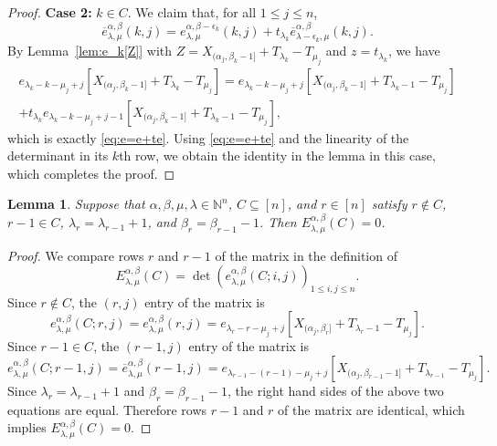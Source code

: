 \documentclass[12pt]{amsart}
\numberwithin{equation}{section}
\newtheorem{lem}[thm]{Lemma}
\theoremstyle{definition}
\newcommand\ove{\overline{e}}
\newcommand\NN{\mathbb{N}}
\begin{document}
\begin{proof}
\textbf{Case 2:} $k\in C$. We claim that, for all $1\le j\le n$,
\begin{equation}\label{eq:e=e+te}
  \ove_{\lambda,\mu}^{\alpha,\beta}(k,j)
  =e_{\lambda,\mu}^{\alpha,\beta-\epsilon_k}(k,j)
  +t_{\lambda_k} \ove_{\lambda-\epsilon_k,\mu}^{\alpha,\beta}(k,j).
\end{equation}
  By Lemma~\ref{lem:e_k[Z]} with
  $Z=X_{(\alpha_j,\beta_k-1]}+T_{\lambda_k}-T_{\mu_j}$ and $z=t_{\lambda_k}$,
  we have
  \begin{multline*}
    e_{\lambda_k-k-\mu_j+j}[X_{(\alpha_j,\beta_k-1]}+T_{\lambda_k}-T_{\mu_j}]
    = e_{\lambda_k-k-\mu_j+j}[X_{(\alpha_j,\beta_k-1]}+T_{\lambda_k-1}-T_{\mu_j}]
    \\ + t_{\lambda_k} 
    e_{\lambda_k-k-\mu_j+j-1}[X_{(\alpha_j,\beta_k-1]}+T_{\lambda_k-1}-T_{\mu_j}],
  \end{multline*}
  which is exactly \eqref{eq:e=e+te}. Using \eqref{eq:e=e+te} and the linearity
  of the determinant in its $k$th row, we obtain the identity in the lemma in
  this case, which completes the proof.
\end{proof}

\begin{lem}\label{lem:equal rows}
  Suppose that $\alpha, \beta,\mu,\lambda \in \NN^n$, $C \subseteq [n]$, and
  $r \in [n]$ satisfy $r \notin C$, $r-1 \in C$, $\lambda_r = \lambda_{r-1}+1$,
  and $\beta_r = \beta_{r-1}-1$. Then $E_{\lambda, \mu}^{\alpha, \beta}(C) = 0$.
\end{lem}
\begin{proof}
We
  compare rows $r$ and $r-1$ of the matrix in the definition of
\[
  E_{\lambda, \mu}^{\alpha, \beta}(C) =
\det\left(e^{\alpha,\beta}_{\lambda,\mu} (C;i,j)\right)_{1\le i,j\le n}.
\] 
Since $r\notin C$, the $(r,j)$ entry of the matrix is 
\[
  e^{\alpha,\beta}_{\lambda,\mu}(C;r,j)
  =e^{\alpha,\beta}_{\lambda,\mu}(r,j) 
    =e_{\lambda_r-r-\mu_j+j}[X_{(\alpha_j,\beta_r]}+T_{\lambda_r-1}-T_{\mu_j}].
\]
Since $r-1\in C$, the $(r-1,j)$ entry of the matrix is 
\[
  e^{\alpha,\beta}_{\lambda,\mu}(C;r-1,j)
  =\ove^{\alpha,\beta}_{\lambda,\mu}(r-1,j) 
    =e_{\lambda_{r-1}-(r-1)-\mu_j+j}[X_{(\alpha_j,\beta_{r-1}-1]}+T_{\lambda_{r-1}}-T_{\mu_j}].
\]
Since $\lambda_r = \lambda_{r-1}+1$ and $\beta_r = \beta_{r-1}-1$, the right
hand sides of the above two equations are equal. Therefore rows $r-1$ and $r$ of
the matrix are identical, which implies $E_{\lambda, \mu}^{\alpha, \beta}(C) =
0$.
\end{proof}
\end{document}
